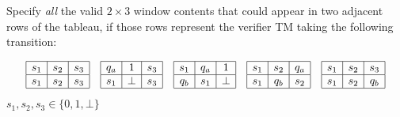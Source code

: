\documentclass[12pt, letterpaper]{article}
\begin{document}
\begin{subproblem}{}
    Specify \emph{all} the valid $2 \times 3$ window contents that could appear in two adjacent rows of the tableau, if those rows represent the verifier TM taking the following transition:
  \begin{center}
  \end{center}
\end{subproblem}
\begin{solution}
    \[
    \begin{array}{|c|c|c|}
      \hline
      s_1 & s_2 & s_3 \\
      \hline
      s_1 & s_2 & s_3 \\
      \hline
    \end{array}
    \quad
    \begin{array}{|c|c|c|}
        \hline
        q_a & 1 & s_3 \\
        \hline
        s_1 & \bot & s_3 \\
        \hline
    \end{array}
    \quad
    \begin{array}{|c|c|c|}
          \hline
          s_1 & q_a & 1 \\
          \hline
          q_b & s_1 & \bot \\
          \hline
    \end{array}
    \quad
    \begin{array}{|c|c|c|}
        \hline
        s_1 & s_2 & q_a \\
        \hline
        s_1 & q_b & s_2 \\
        \hline
    \end{array}
    \quad
    \begin{array}{|c|c|c|}
        \hline
        s_1 & s_2 & s_3 \\
        \hline
        s_1 & s_2 & q_b \\
        \hline
    \end{array}
  \]
  $s_1,s_2,s_3 \in \{0,1,\bot\}$
\end{solution}
\end{document}
